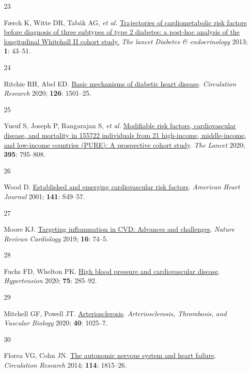 \documentclass[
  letterpaper,
  headsepline=true,
  open=any]{scrbook}
\newlength{\cslhangindent}
\newlength{\csllabelwidth}
\newlength{\cslentryspacingunit} %
\newenvironment{CSLReferences}[2] %
 {%
  \setlength{\parindent}{0pt}
  \ifodd #1
  \let\oldpar\par
  \def\par{\hangindent=\cslhangindent\oldpar}
  \fi
  \setlength{\parskip}{#2\cslentryspacingunit}
 }%
 {}
\newcommand{\CSLLeftMargin}[1]{\parbox[t]{\csllabelwidth}{#1}}
\newcommand{\CSLRightInline}[1]{\parbox[t]{\linewidth - \csllabelwidth}{#1}\break}
\begin{document}
\begin{CSLReferences}{0}{0}
\leavevmode{}%
\CSLLeftMargin{23 }%
\CSLRightInline{Færch K, Witte DR, Tabák AG, \emph{et al.}
\href{https://doi.org/10.1016/S2213-8587(13)70008-1}{Trajectories of
cardiometabolic risk factors before diagnosis of three subtypes of type
2 diabetes: a post-hoc analysis of the longitudinal Whitehall II cohort
study.} \emph{The lancet Diabetes \& endocrinology} 2013; \textbf{1}:
43--51.}

\leavevmode{}%
\CSLLeftMargin{24 }%
\CSLRightInline{Ritchie RH, Abel ED.
\href{https://doi.org/10.1161/CIRCRESAHA.120.315913}{Basic mechanisms of
diabetic heart disease}. \emph{Circulation Research} 2020; \textbf{126}:
1501--25.}

\leavevmode{}%
\CSLLeftMargin{25 }%
\CSLRightInline{Yusuf S, Joseph P, Rangarajan S, \emph{et al.}
\href{https://doi.org/10.1016/S0140-6736(19)32008-2}{Modifiable risk
factors, cardiovascular disease, and mortality in 155{\hphantom{,}}722
individuals from 21 high-income, middle-income, and low-income countries
(PURE): A prospective cohort study}. \emph{The Lancet} 2020;
\textbf{395}: 795--808.}

\leavevmode{}%
\CSLLeftMargin{26 }%
\CSLRightInline{Wood D.
\href{https://doi.org/10.1067/mhj.2001.109951}{Established and emerging
cardiovascular risk factors}. \emph{American Heart Journal} 2001;
\textbf{141}: S49--57.}

\leavevmode{}%
\CSLLeftMargin{27 }%
\CSLRightInline{Moore KJ.
\href{https://doi.org/10.1038/s41569-018-0144-3}{Targeting inflammation
in CVD: Advances and challenges}. \emph{Nature Reviews Cardiology} 2019;
\textbf{16}: 74--5.}

\leavevmode{}%
\CSLLeftMargin{28 }%
\CSLRightInline{Fuchs FD, Whelton PK.
\href{https://doi.org/10.1161/HYPERTENSIONAHA.119.14240}{High blood
pressure and cardiovascular disease}. \emph{Hypertension} 2020;
\textbf{75}: 285--92.}

\leavevmode{}%
\CSLLeftMargin{29 }%
\CSLRightInline{Mitchell GF, Powell JT.
\href{https://doi.org/10.1161/ATVBAHA.120.314208}{Arteriosclerosis}.
\emph{Arteriosclerosis, Thrombosis, and Vascular Biology} 2020;
\textbf{40}: 1025--7.}

\leavevmode{}%
\CSLLeftMargin{30 }%
\CSLRightInline{Florea VG, Cohn JN.
\href{https://doi.org/10.1161/CIRCRESAHA.114.302589}{The autonomic
nervous system and heart failure}. \emph{Circulation Research} 2014;
\textbf{114}: 1815--26.}


\end{CSLReferences}
\end{document}
